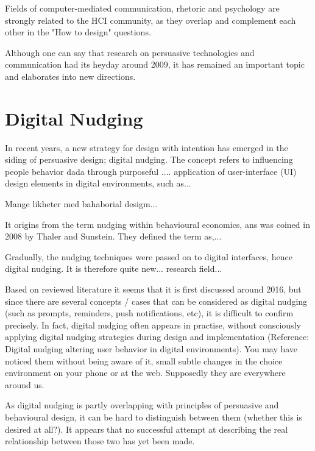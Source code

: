 Fields of computer-mediated communication, rhetoric and psychology are strongly related to the HCI community, as they overlap and complement each other in the "How to design" questions. 


Although one can say that research on persuasive technologies and communication had its heyday around 2009, it has remained an important topic and elaborates into new directions. 


\section{Digital Nudging}
In recent years, a new strategy for design with intention has emerged in the siding of persuasive design; digital nudging. The concept refers to influencing people behavior dada through purposeful .... application of user-interface (UI) design elements in digital environments, such as... 

Mange likheter med bahaborial desigm... 

It origins from the term nudging within behavioural economics, ans was coined in 2008 by Thaler and Sunstein. They defined the term as,...

Gradually, the nudging techniques were passed on to digital interfaces, hence digital nudging. It is therefore quite new...  research field... 

Based on reviewed literature it seems that it is first discussed around 2016, but since there are several concepts / cases that can be considered as digital nudging (such as prompts, reminders, push notifications, etc), it is difficult to confirm precisely. In fact, digital nudging often appears in practise, without consciously applying digital nudging strategies during design and implementation (Reference: Digital nudging altering user behavior in digital environments). You may have noticed them without being aware of it, small subtle changes in the choice environment on your phone or at the web. Supposedly they are everywhere around us.

As digital nudging is partly overlapping with principles of persuasive and behavioural design, it can be hard to distinguish between them (whether this is desired at all?). It appears that no successful attempt at describing the real relationship between those two has yet been made. 

